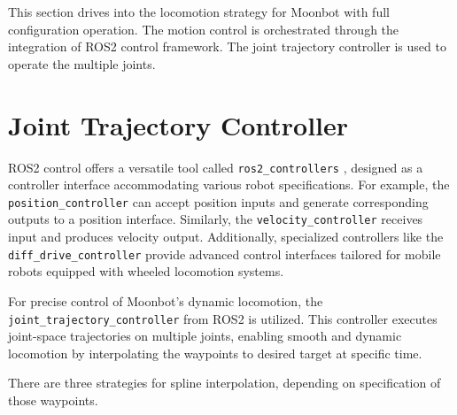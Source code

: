 This section drives into the locomotion strategy for Moonbot with full configuration operation. The motion control is orchestrated through the integration of ROS2 control framework. The joint trajectory controller is used to operate the multiple joints.

\section{Joint Trajectory Controller}
ROS2 control offers a versatile tool called \texttt{ros2\_controllers} \cite{ros2controllers}, designed as a controller interface accommodating various robot specifications. For example, the \texttt{position\_controller} can accept position inputs and generate corresponding outputs to a position interface. Similarly, the \texttt{velocity\_controller} receives input and produces velocity output. Additionally, specialized controllers like the \texttt{diff\_drive\_controller} provide advanced control interfaces tailored for mobile robots equipped with wheeled locomotion systems.

For precise control of Moonbot's dynamic locomotion, the \texttt{joint\_trajectory\_controller} from ROS2 is utilized. This controller executes joint-space trajectories on multiple joints, enabling smooth and dynamic locomotion by interpolating the waypoints to desired target at specific time. 

There are three strategies for spline interpolation, depending on specification of those waypoints. 

